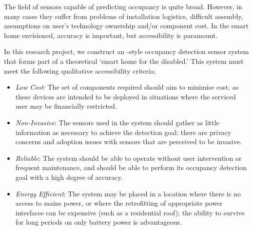 \documentclass[../thesis/thesis.tex]{subfiles}
\begin{document}
The field of sensors capable of predicting occupancy is quite broad. However, in many cases they suffer from problems of installation logistics, difficult assembly, assumptions on user's technology ownership and/or component cost. In the smart home envisioned, accuracy is important, but accessibility is paramount.

In this research project, we construct an \iot-style occupancy detection sensor system that forms part of a theoretical `smart home for the disabled.' This system must meet the following qualitative accessibility criteria;

\begin{itemize}
 \item \emph{Low Cost}: The set of components required should aim to minimise cost, as these devices are intended to be deployed in situations where the serviced user may be financially restricted.
 
 \item \emph{Non-Invasive}: The sensors used in the system should gather as little information as necessary to achieve the detection goal; there are privacy concerns and adoption issues with sensors that are perceived to be invasive.
 
 \item \emph{Reliable}: The system should be able to operate without user intervention or frequent maintenance, and should be able to perform its occupancy detection goal with a high degree of accuracy.
 
 \item \emph{Energy Efficient}: The system may be placed in a location where there is no access to mains power, or where the retrofitting of appropriate power interfaces can be expensive (such as a residential roof); the ability to survive for long periods on only battery power is advantageous.
\end{itemize}
\end{document}
